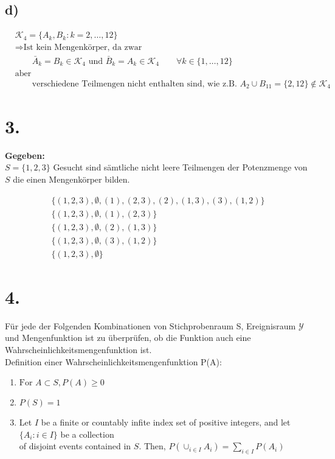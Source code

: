 \documentclass{article}
\begin{document}
\subsection*{d)}
\begin{align*}
    &\mathcal{K}_{4} = \{A_{k}, B_{k}: k = 2, \ldots, 12 \} \\
    &\Rightarrow \text{Ist kein Mengenkörper, da  zwar} \\
    & \qquad \bar{A}_{k} = B_{k} \in \mathcal{K}_{4} \text{ und } \bar{B}_{k} = A_{k} \in \mathcal{K}_{4} \qquad \forall k \in \{ 1,\ldots,12\}\\
    &\text{aber} \\
    &\qquad \text{verschiedene Teilmengen nicht enthalten sind, wie z.B. } A_{2} \cup B_{11} = \{2, 12\} \notin \mathcal{K}_{4} 
\end{align*}
\section*{3. }
\textbf{Gegeben:}\\ 

$S = \{1,2,3\}$ Gesucht sind sämtliche nicht leere Teilmengen der Potenzmenge von $S$ die einen Mengenkörper bilden. 

\begin{align*}
    \{(1,2,3), \emptyset, (1), (2,3), (2), (1,3), (3), (1,2)\}\\
    \{(1,2,3), \emptyset, (1), (2,3)\} \\
    \{(1,2,3), \emptyset, (2), (1,3)\} \\
    \{(1,2,3), \emptyset, (3), (1,2)\} \\
    \{(1,2,3), \emptyset\}
\end{align*}

\section*{4. } 


Für jede der Folgenden Kombinationen von Stichprobenraum S, Ereignisraum $\mathcal{Y}$ und Mengenfunktion ist zu überprüfen,
ob die Funktion auch eine Wahrscheinlichkeitsmengenfunktion ist. \\

Definition einer Wahrscheinlichkeitsmengenfunktion P(A):
\begin{enumerate}[label=\roman*.]
    \item $\text{For } A \subset S, P(A) \geq 0 $
    \item $P(S) = 1$
    \item Let $I$ be a finite or countably infite index set of positive integers, and let $\{A_{i}: i \in I\}$ be a collection \\
     of disjoint events contained in $S$. Then, $P(\cup_{i\in I}A_{i}) = \sum_{i \in I} P(A_{i})$
\end{enumerate}
\end{document}

